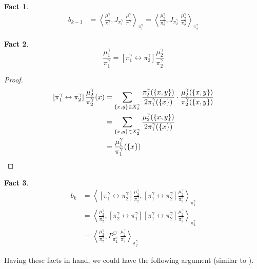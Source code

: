 \documentclass{article}
\newtheorem{fact}{Fact}[section]
\def\Op#1#2{\left[#1 \leftrightarrow #2\right]}
\def\<{\left\langle}
\def\>{\right\rangle}
\begin{document}
\begin{fact}
  \begin{align*}
    b_{k-1}
    &= \<\frac{\mu_1^\gamma}{\pi_1^\gamma}, J_{\pi_1^\gamma}\; \frac{\mu_1^\gamma}{\pi_1^\gamma}\>_{\pi_1^\gamma}
     = \<\frac{\mu_2^\gamma}{\pi_2^\gamma}, J_{\pi_2^\gamma}\; \frac{\mu_2^\gamma}{\pi_2^\gamma}\>_{\pi_2^\gamma}
  \end{align*}
\end{fact}

\begin{fact}
  \[\frac{\mu_1^\gamma}{\pi_1^\gamma} = \Op{\pi_1^\gamma}{\pi_2^\gamma} \frac{\mu_2^\gamma}{\pi_2^\gamma}\]
\end{fact}
\begin{proof}
  \begin{align*}
    \Op{\pi_1^\gamma}{\pi_2^\gamma} \frac{\mu_2^\gamma}{\pi_2^\gamma} (x)
    &= \sum_{\{x,y\}\in X_2^\gamma} \frac{\pi_2^\gamma(\{x, y\})}{2\pi_1^\gamma(\{x\})} \cdot \frac{\mu_2^\gamma(\{x,y\})}{\pi_2^\gamma(\{x,y\})}\\
    &= \sum_{\{x,y\}\in X_2^\gamma} \frac{\mu_2^\gamma(\{x, y\})}{2\pi_1^\gamma(\{x\})} \\
    &= \frac{\mu_1^\gamma}{\pi_1^\gamma}(\{x\}) \qedhere
  \end{align*}
\end{proof}
\begin{fact}
  \begin{align*}
    b_k
    &= \< \Op{\pi_1^\gamma}{\pi_2^\gamma} \frac{\mu_2^\gamma}{\pi_2^\gamma}, \Op{\pi_1^\gamma}{\pi_2^\gamma} \frac{\mu_2^\gamma}{\pi_2^\gamma}\>_{\pi_1^\gamma} \\
    &= \< \frac{\mu_2^\gamma}{\pi_2^\gamma}, \Op{\pi_2^\gamma}{\pi_1^\gamma} \Op{\pi_1^\gamma}{\pi_2^\gamma} \frac{\mu_2^\gamma}{\pi_2^\gamma}\>_{\pi_2^\gamma} \\
    &= \< \frac{\mu_2^\gamma}{\pi_2^\gamma}, P_{\pi_2^\gamma}^{\bigtriangledown}\; \frac{\mu_2^\gamma}{\pi_2^\gamma}\>_{\pi_2^\gamma}
  \end{align*}
\end{fact}

Having these facts in hand, we could have the following argument (similar to \cite{alev2020improved}).
\end{document}
